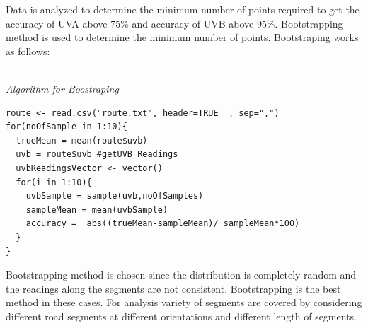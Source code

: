 \documentclass[conference]{IEEETran}
\begin{document}
Data is analyzed to determine the minimum number of points required to get the accuracy of UVA above 75\% and accuracy of UVB above 95\%. Bootstrapping method is used to determine the minimum number of points. Bootstraping works as follows:
\\
\\
{ 	
\begin{center} 
{\small \sl Algorithm for Boostraping }
\end{center}
}



\begin{lstlisting}
route <- read.csv("route.txt", header=TRUE  , sep=",")
for(noOfSample in 1:10){  
  trueMean = mean(route$uvb)
  uvb = route$uvb #getUVB Readings
  uvbReadingsVector <- vector()
  for(i in 1:10){
    uvbSample = sample(uvb,noOfSamples)
    sampleMean = mean(uvbSample)
    accuracy =  abs((trueMean-sampleMean)/ sampleMean*100)
  }
}\end{lstlisting}


Bootstrapping method is chosen since the distribution is completely random and the readings along the segments are not consistent. Bootstrapping is the best method in these cases. For analysis variety of segments are covered by considering different road segments at different orientations and different length of segments. 
\end{document}

